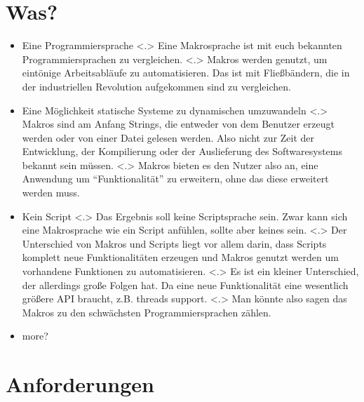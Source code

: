 \section{Was?}
  \begin{frame}
    \begin{itemize}[<+- | alert@+>]
      \item
        Eine Programmiersprache
        \note[item]<.>{
          Eine Makrosprache ist mit euch bekannten Programmiersprachen zu vergleichen.
        }
        \note[item]<.>{
          Makros werden genutzt, um eintönige Arbeitsabläufe zu automatisieren. Das ist mit Fließbändern, die in der industriellen Revolution aufgekommen sind zu vergleichen.
        }
      \item
        Eine Möglichkeit statische Systeme zu dynamischen umzuwandeln
        \note[item]<.>{
          Makros sind am Anfang Strings, die entweder von dem Benutzer erzeugt werden oder von einer Datei gelesen werden. Also nicht zur Zeit der Entwicklung, der Kompilierung oder der Auslieferung des Softwaresystems bekannt sein müssen.
        }
        \note[item]<.>{
          Makros bieten es den Nutzer also an, eine Anwendung um ``Funktionalität'' zu erweitern, ohne das diese erweitert werden muss.
        }
      \item Kein Script
        \note[item]<.>{
          Das Ergebnis soll keine Scriptsprache sein. Zwar kann sich eine Makrosprache wie ein Script anfühlen, sollte aber keines sein.
        }
        \note[item]<.>{
          Der Unterschied von Makros und Scripts liegt vor allem darin, dass Scripts komplett neue Funktionalitäten erzeugen und Makros genutzt werden um vorhandene Funktionen zu automatisieren.
        }
        \note[item]<.>{
          Es ist ein kleiner Unterschied, der allerdings große Folgen hat. Da eine neue Funktionalität eine wesentlich größere API braucht, z.B. threads support.
        }
        \note[item]<.>{
          Man könnte also sagen das Makros zu den schwächsten Programmiersprachen zählen.
        }
        \item \alert{\color{red} more?} %
    \end{itemize}
  \end{frame}

\section{Anforderungen}

